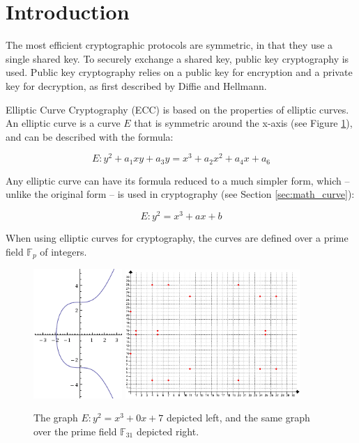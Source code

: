 \section{Introduction}

The most efficient cryptographic protocols are symmetric, in that they use a single shared key.
To securely exchange a shared key, public key cryptography is used. Public key cryptography
relies on a public key for encryption and a private key for decryption, as first described by
Diffie and Hellmann.

Elliptic Curve Cryptography (ECC) is based on the properties of elliptic curves.
An elliptic curve is a curve \(E\) that is symmetric around the x-axis (see Figure \ref{fig:graphs}),
and can be described with the formula:

\begin{equation}
	E: y^2 + a_1xy + a_3y = x^3 + a_2x^2 + a_4x + a_6
\end{equation}

Any elliptic curve can have its formula reduced to a much simpler form, which -- unlike the original
form -- is used in cryptography (see Section \ref{sec:math_curve}):

\begin{equation}
	E: y^2 = x^3 + ax + b
\end{equation}

When using elliptic curves for cryptography, the curves are defined over a prime field \(\mathbb{F}_p\)
of integers.

\begin{figure}[htb]
	\centering
	\includegraphics[width=0.30\textwidth]{introduction/secp256k1-graph}
	\includegraphics[width=0.59\textwidth]{introduction/secp256k1-graph-over-field-p31}
	\caption{The graph \(E: y^2 = x^3 + 0x + 7\) depicted left, and the same graph over the prime field
		\(\mathbb{F}_{31}\) depicted right.}
	\label{fig:graphs}
\end{figure}

